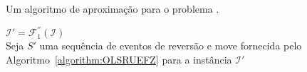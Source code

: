 \begin{algorithm}[!tbh]
  \caption{Um algoritmo de aproximação para o problema \SbFIRM{}.\label{algorithm:DYDJWEUH}}
  $\mathcal{I}' = \mathcal{F}_{1}^{''}(\mathcal{I})$ \\
  Seja $S'$ uma sequência de eventos de reversão e move fornecida pelo Algoritmo~\ref{algorithm:OLSRUEFZ} para a instância $\mathcal{I}'$ \\
\end{algorithm}